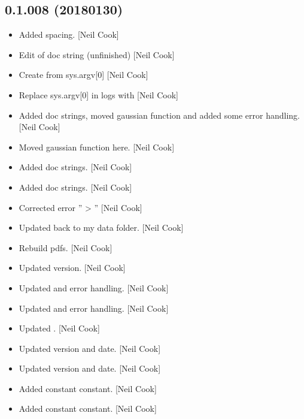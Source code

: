\documentclass[a4paper,10pt,english]{report}
\begin{document}
\subsection{0.1.008 (2018\sphinxhyphen{}01\sphinxhyphen{}30)}
\label{\detokenize{misc/changelog:id514}}\begin{itemize}
\item {} 
Added spacing. {[}Neil Cook{]}

\item {} 
Edit of doc string (unfinished) {[}Neil Cook{]}

\item {} 
Create  from sys.argv{[}0{]} {[}Neil Cook{]}

\item {} 
Replace sys.argv{[}0{]} in logs with
 {[}Neil Cook{]}

\item {} 
Added doc strings, moved gaussian function and added some error
handling. {[}Neil Cook{]}

\item {} 
Moved gaussian function here. {[}Neil Cook{]}

\item {} 
Added doc strings. {[}Neil Cook{]}

\item {} 
Added doc strings. {[}Neil Cook{]}

\item {} 
Corrected error ” \textendash{}\textgreater{} ” {[}Neil Cook{]}

\item {} 
Updated back to my data folder. {[}Neil Cook{]}

\item {} 
Rebuild pdfs. {[}Neil Cook{]}

\item {} 
Updated version. {[}Neil Cook{]}

\item {} 
Updated  and error handling. {[}Neil Cook{]}

\item {} 
Updated  and error handling. {[}Neil Cook{]}

\item {} 
Updated . {[}Neil Cook{]}

\item {} 
Updated version and date. {[}Neil Cook{]}

\item {} 
Updated version and date. {[}Neil Cook{]}

\item {} 
Added  constant constant. {[}Neil Cook{]}

\item {} 
Added  constant constant. {[}Neil Cook{]}

\end{itemize}
\end{document}
